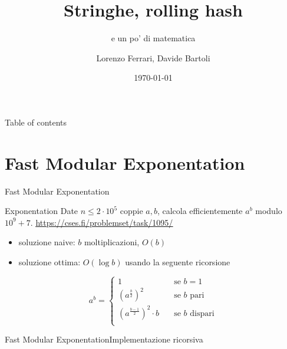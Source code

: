 \documentclass[compress]{beamer}
\title{Stringhe, rolling hash}
\subtitle{e un po' di matematica}
\author{Lorenzo Ferrari, Davide Bartoli}
\date{\today}
\begin{document}
\begin{frame}
    \maketitle
\end{frame}

\begin{frame}{Table of contents}
  \tableofcontents
\end{frame}

\section{Fast Modular Exponentation}
\begin{frame}{Fast Modular Exponentation}
    \begin{exampleblock}{Exponentation}
        Date $n \leq 2 \cdot 10^5$ coppie $a,b$, calcola efficientemente $a^b$ modulo $10^9 + 7$.
        \vfill
        \small{\underline{\url{https://cses.fi/problemset/task/1095/}}}
    \end{exampleblock}
    \pause
    \begin{itemize}
        \item soluzione naive: $b$ moltiplicazioni, $O(b)$
        \pause
        \item soluzione ottima: $O(\log b)$ usando la seguente ricorsione
    \end{itemize}
    \[
        a^b = 
        \begin{cases}
            1 \quad &\text{se } b = 1 \\
            \left( a^\frac{b}{2} \right)^2 \quad &\text{se $b$ pari} \\
            \left( a^\frac{b-1}{2} \right)^2 \cdot b \quad &\text{se $b$ dispari} \\
        \end{cases}
    \]
\end{frame}

\begin{frame}{Fast Modular Exponentation}{Implementazione ricorsiva}
\end{frame}
\end{document}
